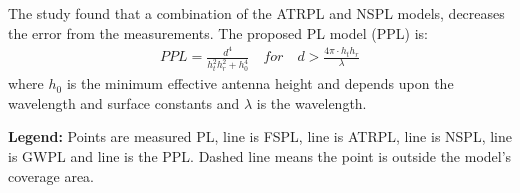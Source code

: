 \large

\begin{minipage}{.45\textwidth}
The study found that a combination of the ATRPL and NSPL models, decreases the error from the measurements. The proposed PL model (PPL) is:
\vspace{-0.5em}\begin{align*}
PPL = \frac{d^4}{h_t^2 h_r^2+h_0^4}\quad for \quad d > \frac{4\pi\cdot h_th_r}{\lambda}
\end{align*}
where $h_0$ is the minimum effective antenna height and depends upon the wavelength and surface constants and $\lambda$ is the wavelength.


\end{minipage}%
\hspace{1cm}
\begin{minipage}{0.45\textwidth}
\begin{center}

\end{center}
\end{minipage}

\vspace{0.5em}
\begin{minipage}{0.5\textwidth}
\begin{center}

\end{center}
\end{minipage}
\begin{minipage}{0.5\textwidth}
\begin{center}

\end{center}
\end{minipage}

\vspace{0.5em}
\textbf{Legend:} Points are measured PL, \textcolor{thomasblue}{line} is FSPL, \textcolor{thomasred}{line} is ATRPL, \textcolor{thomasgreen}{line} is NSPL, \textcolor{thomaspurple}{line} is GWPL and \textcolor{thomasyellow}{line} is the PPL. Dashed line means the point is outside the model's coverage area.\\
